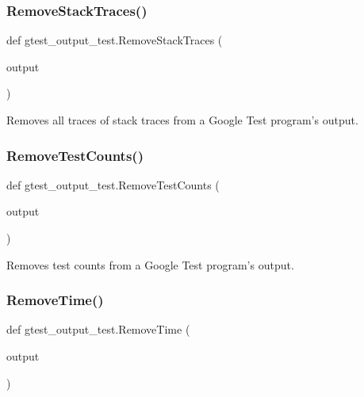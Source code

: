 \subsubsection{\texorpdfstring{Remove\+Stack\+Traces()}{RemoveStackTraces()}}
{\footnotesize\ttfamily def gtest\+\_\+output\+\_\+test.\+Remove\+Stack\+Traces (\begin{DoxyParamCaption}\item[{}]{output }\end{DoxyParamCaption})}

\begin{DoxyVerb}Removes all traces of stack traces from a Google Test program's output.\end{DoxyVerb}
 \mbox{\label{namespacegtest__output__test_a74ae74aaa09cc2651aabbec468a878d9}} 
\subsubsection{\texorpdfstring{Remove\+Test\+Counts()}{RemoveTestCounts()}}
{\footnotesize\ttfamily def gtest\+\_\+output\+\_\+test.\+Remove\+Test\+Counts (\begin{DoxyParamCaption}\item[{}]{output }\end{DoxyParamCaption})}

\begin{DoxyVerb}Removes test counts from a Google Test program's output.\end{DoxyVerb}
 \mbox{\label{namespacegtest__output__test_a2f40fbdd1c9f47da27109abb3fd2d80d}} 
\subsubsection{\texorpdfstring{Remove\+Time()}{RemoveTime()}}
{\footnotesize\ttfamily def gtest\+\_\+output\+\_\+test.\+Remove\+Time (\begin{DoxyParamCaption}\item[{}]{output }\end{DoxyParamCaption})}

